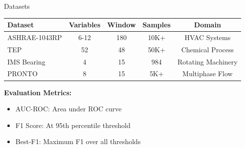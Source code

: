\documentclass[aspectratio=169,11pt]{beamer}
\begin{document}
\begin{frame}{Datasets}
    \begin{table}[h]
        \centering
        \small
        \begin{tabular}{lcccc}
            \toprule
            \textbf{Dataset} & \textbf{Variables} & \textbf{Window} & \textbf{Samples} & \textbf{Domain} \\
            \midrule
            ASHRAE-1043RP & 6-12 & 180 & 10K+ & HVAC Systems \\
            TEP & 52 & 48 & 50K+ & Chemical Process \\
            IMS Bearing & 4 & 15 & 984 & Rotating Machinery \\
            PRONTO & 8 & 15 & 5K+ & Multiphase Flow \\
            \bottomrule
        \end{tabular}
    \end{table}

    \vspace{0.3cm}
    \textbf{Evaluation Metrics:}
    \begin{itemize}
        \item AUC-ROC: Area under ROC curve
        \item F1 Score: At 95th percentile threshold
        \item Best-F1: Maximum F1 over all thresholds
    \end{itemize}
\end{frame}
\end{document}
